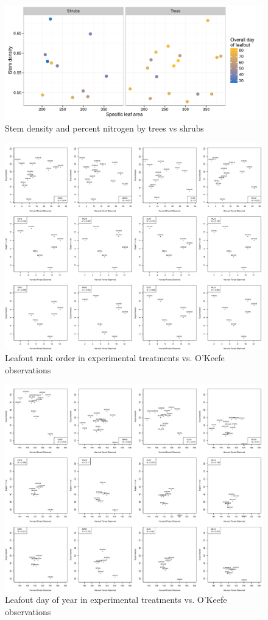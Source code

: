 \documentclass{article}
\begin{document}
\begin{figure}
\caption{Stem density and percent nitrogen by trees vs shrubs}
\label{figS10}
\includegraphics[scale=0.95, page=3]{Tree_shrub_traits}
\end{figure}

\clearpage


\begin{figure}
\caption{Leafout rank order in experimental treatments vs. O'Keefe observations}
\label{figS11}
\includegraphics{leafout_exp_obs_corr}
\end{figure}

\begin{figure}
\caption{Leafout day of year in experimental treatments vs. O'Keefe observations}
\label{figS12}
\includegraphics{leafout_exp_obs_corr_day}
\end{figure}


%
%
\end{document}
